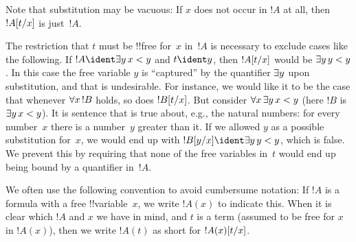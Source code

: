 \documentclass[../../../include/open-logic-section]{subfiles}
\begin{document}
\begin{explain}
Note that substitution may be vacuous: If $x$ does not occur in $!A$
at all, then $!A[t/x]$ is just~$!A$.

The restriction that $t$ must be !!{free for}~$x$ in~$!A$ is necessary to
exclude cases like the following. If $!A \ident \lexists[y][x < y]$
and $t \ident y$, then $!A[t/x]$ would be $\lexists[y][y <
  y]$. In this case the free variable $y$ is ``captured'' by the
quantifier $\lexists[y]$ upon substitution, and that is undesirable.
For instance, we would like it to be the case that whenever
$\lforall[x][!B]$ holds, so does $!B[t/x]$. But consider
$\lforall[x][\lexists[y][x < y]]$ (here $!B$ is $\lexists[y][x <
  y]$). It is sentence that is true about, e.g., the natural numbers:
for every number~$x$ there is a number~$y$ greater than it. If we
allowed $y$ as a possible substitution for~$x$, we would end up with
$\Subst{!B}{y}{x} \ident \lexists[y][y < y]$, which is false. We
prevent this by requiring that none of the free variables in~$t$ would
end up being bound by a quantifier in~$!A$.
\end{explain}

We often use the following convention to avoid cumbersume notation: If
$!A$ is a formula with a free !!{variable}~$x$, we write $!A(x)$ to
indicate this. When it is clear which $!A$ and $x$ we have in mind,
and $t$ is a term (assumed to be free for $x$ in $!A(x)$), then we
write $!A(t)$ as short for $!A(x)[t/x]$.
\end{document}
